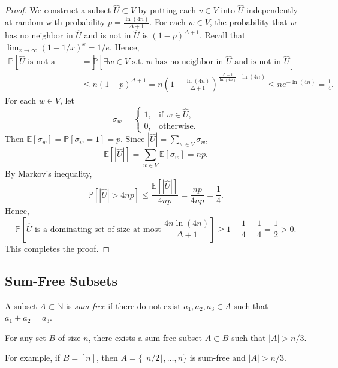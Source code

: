 \documentclass[letterpaper, reqno,11pt]{article}
\newcommand{\NN}{\mathbb{N}}
\newcommand{\PP}{\mathbb{P}}
\newcommand{\EE}{\mathbb{E}}
\begin{document}
\begin{proof}
  We construct a subset $\hat{U} \subset V$ by putting each $v \in V$ into $\hat{U}$ independently at random with probability $p = \frac{\ln(4n)}{\Delta + 1}$. For each $w \in V$, the probability that $w$ has no neighbor in $\hat{U}$ and is not in $\hat{U}$ is $(1 - p)^{\Delta + 1}$. Recall that $\lim_{x \to \infty} (1 - 1/x)^x = 1/e$. Hence,
  \begin{align*}
    \PP\left[\text{$\hat{U}$ is not a dominating set}\right] &= \PP\left[\exists w \in V \text{ s.t.\ $w$ has no neighbor in $\hat{U}$ and is not in $\hat{U}$}\right] \\
    &\leq n (1 - p)^{\Delta + 1} = n\left(1 - \frac{\ln(4n)}{\Delta + 1}\right)^{\frac{\Delta + 1}{\ln(4n)} \cdot \ln(4n)} \leq ne^{-\ln(4n)} = \frac{1}{4}.
  \end{align*}
  For each $w \in V$, let
  $$ \sigma_w = \left\{
    \begin{array}{ll}
      1, & \text{if $w \in \hat{U}$}, \\
      0, & \text{otherwise}.
    \end{array}
  \right. $$
  Then $\EE[\sigma_w] = \PP[\sigma_w = 1] = p$. Since $|\hat{U}| = \sum_{w \in V} \sigma_w$,
  $$ \EE\left[\left|\hat{U}\right|\right] = \sum_{w \in V} \EE\left[\sigma_w\right] = np. $$
  By Markov's inequality,
  $$ \PP\left[\left|\hat{U}\right| > 4np\right] \leq \frac{\EE\left[\left|\hat{U}\right|\right]}{4np} = \frac{np}{4np} = \frac{1}{4}. $$
  Hence,
  $$ \PP\left[\text{$\hat{U}$ is a dominating set of size at most $\frac{4n\ln(4n)}{\Delta + 1}$}\right] \geq 1 - \frac{1}{4} - \frac{1}{4} = \frac{1}{2} > 0. $$
  This completes the proof.
\end{proof}

\subsection{Sum-Free Subsets}

\begin{definition}
  A subset $A \subset \NN$ is \emph{sum-free} if there do not exist $a_1, a_2, a_3 \in A$ such that $a_1 + a_2 = a_3$.
\end{definition}

\begin{theorem}[Erd\H{o}s '65]
  For any set $B$ of size $n$, there exists a sum-free subset $A \subset B$ such that $|A| > n/3$.
\end{theorem}

For example, if $B = [n]$, then $A = \{ \lfloor n/2 \rfloor, \ldots, n \}$ is sum-free and $|A| > n/3$.
\end{document}

